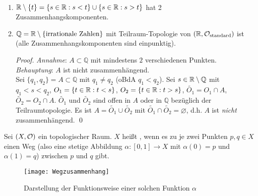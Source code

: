 \begin{example}[Zusammenhangskomponenten]
  \
  \begin{enumerate}
    \item \( \mathbb{R} \setminus \{ t \} = \{ s \in \mathbb{R} : s < t \} \cup \{ s \in \mathbb{R} : s > t \} \) hat 2 Zusammenhangskomponenten.
    \item \( \mathbb{Q} = \mathbb{R} \setminus \{ \text{irrationale Zahlen} \} \) mit Teilraum-Topologie von \( (\mathbb{R}, \mathcal{O}_\text{standard}) \) ist  (alle Zusammenhangskomponenten sind einpunktig). \\
    \begin{proof}
      \emph{Annahme}: \( A \subset \mathbb{Q} \) mit mindestens \( 2 \) verschiedenen Punkten. \\
      \emph{Behauptung}: \( A \) ist nicht zusammenhängend. \\
      Sei \( \{ q_1, q_2 \} = A \subset \mathbb{Q} \) mit \( q_1 \neq q_2 \) (oBdA \( q_1 < q_2 \)). Sei \( s \in \mathbb{R} \setminus \mathbb{Q} \) mit \( q_1 < s < q_2 \), \( O_1 = \{ t \in \mathbb{R}: t < s \} \), \( O_2 = \{ t \in \mathbb{R} : t > s \} \), \( \widetilde{O_1} = O_1 \cap A \), \( \widetilde{O_2} = O_2 \cap A \). \( \widetilde{O_1} \) und \( \widetilde{O_2} \) sind offen in \( A \) oder in \( \mathbb{Q} \) bezüglich der Teilraumtopologie. Es ist \( A = \widetilde{O_1} \cup \widetilde{O_2} \) mit \( \widetilde{O_1} \cap \widetilde{O_2} = \varnothing \), d.h. \( A \) ist \emph{nicht} zusammenhängend. \qed{}
    \end{proof}
  \end{enumerate}
\end{example}

\begin{definition}[Weg-Zusammenhängend]\label{def:wegzusammenhaengend}
  Sei \( (X, \mathcal{O}) \) ein topologischer Raum. \( X \) heißt , wenn es zu je zwei Punkten \( p, q \in X \) einen Weg (also eine stetige Abbildung \( \alpha : [0,1] \to X \) mit \( \alpha(0) = p \) und \( \alpha(1) = q \)) zwischen \( p \) und \( q \) gibt.
  \begin{figure}[H]
    \texttt{[image: Wegzusammenhang]}
    \caption{Darstellung der Funktionsweise einer solchen Funktion \( \alpha \)}
  \end{figure}
\end{definition}

